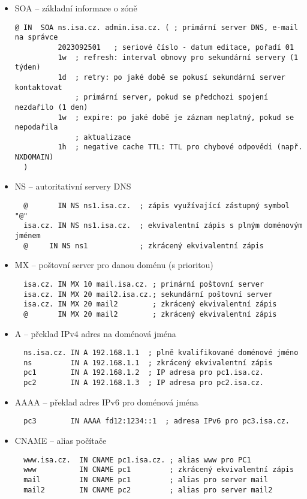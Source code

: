 \begin{itemize}
  \item SOA -- základní informace o zóně
\begin{verbatim}
@ IN  SOA ns.isa.cz. admin.isa.cz. ( ; primární server DNS, e-mail na správce
          2023092501   ; seriové číslo - datum editace, pořadí 01
          1w  ; refresh: interval obnovy pro sekundární servery (1 týden)
          1d  ; retry: po jaké době se pokusí sekundární server kontaktovat
              ; primární server, pokud se předchozi spojení nezdařilo (1 den)
          1w  ; expire: po jaké době je záznam neplatný, pokud se nepodařila
              ; aktualizace
          1h  ; negative cache TTL: TTL pro chybové odpovědi (např. NXDOMAIN)
  )
\end{verbatim}
  \clearpage
  \item NS -- autoritativní servery DNS 
\begin{verbatim}
  @       IN NS ns1.isa.cz.  ; zápis využívající zástupný symbol "@"
  isa.cz. IN NS ns1.isa.cz.  ; ekvivalentní zápis s plným doménovým jménem
  @     IN NS ns1            ; zkrácený ekvivalentní zápis
\end{verbatim}        
  \item MX -- poštovní server pro danou doménu (s prioritou)
\begin{verbatim}
  isa.cz. IN MX 10 mail.isa.cz. ; primární poštovní server 
  isa.cz. IN MX 20 mail2.isa.cz.; sekundární poštovní server
  isa.cz. IN MX 20 mail2        ; zkrácený ekvivalentní zápis
  @       IN MX 20 mail2        ; zkrácený ekvivalentní zápis
\end{verbatim}        
  \item A -- překlad IPv4 adres na doménová jména
\begin{verbatim}
  ns.isa.cz. IN A 192.168.1.1  ; plně kvalifikované doménové jméno
  ns         IN A 192.168.1.1  ; zkrácený ekvivalentní zápis
  pc1        IN A 192.168.1.2  ; IP adresa pro pc1.isa.cz.
  pc2        IN A 192.168.1.3  ; IP adresa pro pc2.isa.cz.
\end{verbatim}        
  \item AAAA -- překlad adres IPv6 pro doménová jména
\begin{verbatim}
  pc3        IN AAAA fd12:1234::1  ; adresa IPv6 pro pc3.isa.cz.
\end{verbatim}        
  \item CNAME -- alias počítače
\begin{verbatim}
  www.isa.cz.  IN CNAME pc1.isa.cz. ; alias www pro PC1
  www          IN CNAME pc1         ; zkrácený ekvivalentní zápis
  mail         IN CNAME pc1         ; alias pro server mail
  mail2        IN CNAME pc2         ; alias pro server mail2   
\end{verbatim}        
\end{itemize}

